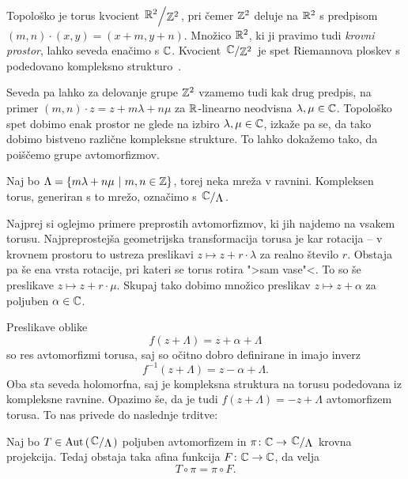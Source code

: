 Topološko je torus kvocient $\kvoc{\R^2}{\Z^2}$, pri čemer $\mathbb{Z}^2$
deluje na $\mathbb{R}^2$ s predpisom $(m,n) \cdot (x,y) = (x+m, y+n)$.
Množico $\mathbb{R}^2$, ki ji pravimo tudi \emph{krovni prostor}, lahko
seveda enačimo s $\mathbb{C}$. Kvocient $\kvoc{\C}{\Z^2}$ je spet
Riemannova ploskev s podedovano kompleksno
strukturo~\cite[razdelek~1.8.2]{Forstneric}.

Seveda pa lahko za delovanje grupe $\mathbb{Z}^2$ vzamemo tudi kak drug
predpis, na primer $(m,n) \cdot z = z + m \lambda+ n \mu$ za
$\mathbb{R}$-linearno neodvisna $\lambda, \mu \in \mathbb{C}$. Topološko spet
dobimo enak prostor ne glede na izbiro
$\lambda, \mu \in \mathbb{C}$, izkaže pa se, da tako dobimo bistveno
različne kompleksne strukture. To lahko dokažemo tako, da poiščemo
grupe avtomorfizmov.

Naj bo $\Lambda = \left\{m \lambda + n \mu~\middle\vert~m, n \in \mathbb{Z}\right\}$, torej
neka mreža v ravnini. Kompleksen torus, generiran s to mrežo,
označimo s $\kvoc{\C}{\Lambda}$.

Najprej si oglejmo primere preprostih avtomorfizmov, ki jih najdemo
na vsakem torusu. Najpreprostejša geometrijska transformacija
torusa je kar rotacija -- v krovnem prostoru to ustreza preslikavi
$z \mapsto z + r \cdot \lambda$ za realno število $r$. Obstaja pa
še ena vrsta rotacije, pri kateri se torus rotira ">sam vase"<.
To so še preslikave $z \mapsto z + r \cdot \mu$. Skupaj tako dobimo
množico preslikav $z \mapsto z + \alpha$ za poljuben
$\alpha \in \mathbb{C}$.



Preslikave oblike
\[
f(z + \Lambda) = z + \alpha + \Lambda
\]
so res avtomorfizmi torusa, saj so očitno dobro definirane in imajo
inverz
\[
f^{-1}(z + \Lambda) = z-\alpha + \Lambda.
\]
Oba sta seveda holomorfna, saj je kompleksna struktura na torusu
podedovana iz kompleksne ravnine. Opazimo še, da je tudi
$f(z + \Lambda) = -z + \Lambda$ avtomorfizem torusa. To nas privede
do naslednje trditve:

\begin{trditev}
Naj bo $T \in \Aut \br{\kvoc{\C}{\Lambda}}$ poljuben avtomorfizem
in $\pi \colon \C \to \kvoc{\C}{\Lambda}$ krovna projekcija. Tedaj
obstaja taka afina funkcija $F \colon \mathbb{C} \to \mathbb{C}$, da velja
\[
T \circ \pi = \pi \circ F.
\]
\end{trditev}

